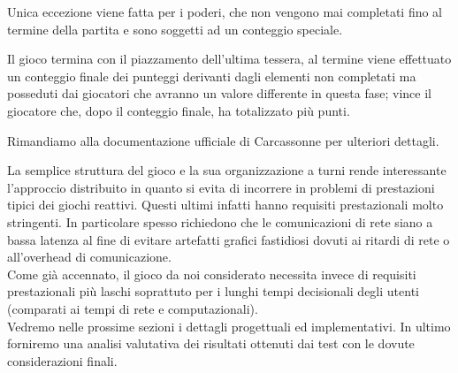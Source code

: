 Unica eccezione viene fatta per i poderi, che non vengono mai completati fino al termine della partita e sono soggetti ad un conteggio speciale.

Il gioco termina con il piazzamento dell'ultima tessera, al termine viene effettuato un conteggio finale dei punteggi derivanti dagli elementi non completati ma posseduti dai giocatori che avranno un valore differente in questa fase; vince il giocatore che, dopo il conteggio finale, ha totalizzato più punti.

Rimandiamo alla documentazione ufficiale di Carcassonne per ulteriori
dettagli.

La semplice struttura del gioco e la sua organizzazione a turni rende
interessante l'approccio distribuito in quanto si evita di incorrere in problemi 
di prestazioni tipici dei giochi reattivi. Questi ultimi infatti hanno requisiti prestazionali molto stringenti. In
particolare spesso richiedono che le comunicazioni di rete siano a bassa
latenza al fine di evitare
artefatti grafici fastidiosi dovuti ai ritardi di rete o all'overhead di
comunicazione.\\
Come già accennato, il gioco da noi considerato necessita invece di
requisiti prestazionali più laschi soprattuto per i lunghi tempi
decisionali degli utenti (comparati ai tempi di rete e computazionali).
\\
Vedremo nelle prossime sezioni i dettagli progettuali ed implementativi.
In ultimo forniremo una analisi valutativa dei risultati ottenuti dai test
con le dovute considerazioni finali.
